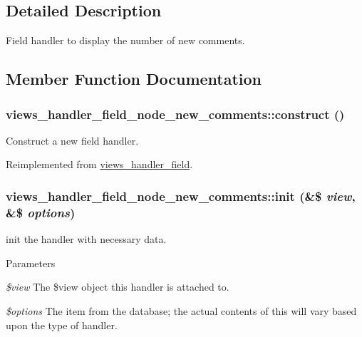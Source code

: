 \subsection{Detailed Description}
Field handler to display the number of new comments. 

\subsection{Member Function Documentation}
\hypertarget{classviews__handler__field__node__new__comments_aa496a5184a390c29a60e0dc7d16c23e5}{
\subsubsection[{construct}]{\setlength{\rightskip}{0pt plus 5cm}views\_\-handler\_\-field\_\-node\_\-new\_\-comments::construct ()}}
\label{classviews__handler__field__node__new__comments_aa496a5184a390c29a60e0dc7d16c23e5}
Construct a new field handler. 

Reimplemented from \hyperlink{classviews__handler__field_a3d50050864c255b71c842972a45d39f6}{views\_\-handler\_\-field}.\hypertarget{classviews__handler__field__node__new__comments_aef91916aec8e7a7c77ea1c9079de19b6}{
\subsubsection[{init}]{\setlength{\rightskip}{0pt plus 5cm}views\_\-handler\_\-field\_\-node\_\-new\_\-comments::init (\&\$ {\em view}, \/  \&\$ {\em options})}}
\label{classviews__handler__field__node__new__comments_aef91916aec8e7a7c77ea1c9079de19b6}
init the handler with necessary data. 
\begin{DoxyParams}{Parameters}
\item[{\em \$view}]The \$view object this handler is attached to. \item[{\em \$options}]The item from the database; the actual contents of this will vary based upon the type of handler. \end{DoxyParams}



